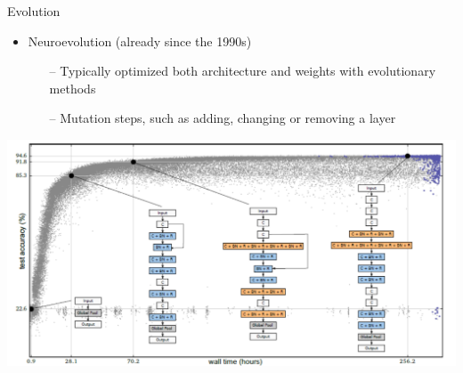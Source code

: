 
\begin{frame}[c]{Evolution}
\centering
\begin{itemize}
\item \alert{Neuroevolution} (already since the 1990s)
\begin{itemize}
	\item[--] Typically optimized both architecture and weights with evolutionary methods
	\item[--] Mutation steps, such as adding, changing or removing a layer
\end{itemize}
\end{itemize}
\includegraphics[width=.8\textwidth]{images_lec7/neuroevolution.png}\\
\end{frame}
